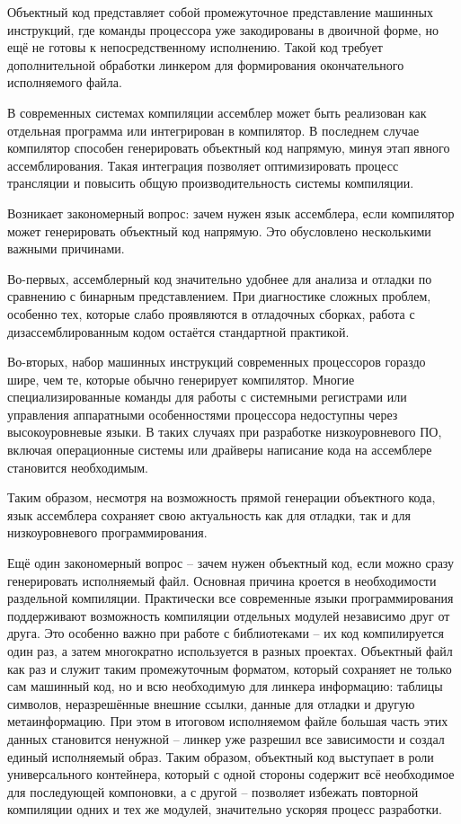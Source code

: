 Объектный код представляет собой промежуточное представление машинных инструкций, где команды процессора уже закодированы в двоичной форме, но ещё не готовы к непосредственному исполнению. Такой код требует дополнительной обработки линкером для формирования окончательного исполняемого файла.

В современных системах компиляции ассемблер может быть реализован как отдельная программа или интегрирован в компилятор. В последнем случае компилятор способен генерировать объектный код напрямую, минуя этап явного ассемблирования. Такая интеграция позволяет оптимизировать процесс трансляции и повысить общую производительность системы компиляции.

Возникает закономерный вопрос: зачем нужен язык ассемблера, если компилятор может генерировать объектный код напрямую. Это обусловлено несколькими важными причинами.

Во-первых, ассемблерный код значительно удобнее для анализа и отладки по сравнению с бинарным представлением. При диагностике сложных проблем, особенно тех, которые слабо проявляются в отладочных сборках, работа с дизассемблированным кодом остаётся стандартной практикой.

Во-вторых, набор машинных инструкций современных процессоров гораздо шире, чем те, которые обычно генерирует компилятор. Многие специализированные команды  для работы с системными регистрами или управления аппаратными особенностями процессора недоступны через высокоуровневые языки. В таких случаях при разработке низкоуровневого ПО, включая операционные системы или драйверы написание кода на ассемблере становится необходимым.

Таким образом, несмотря на возможность прямой генерации объектного кода, язык ассемблера сохраняет свою актуальность как для отладки, так и для низкоуровневого программирования.

Ещё один закономерный вопрос -- зачем нужен объектный код, если можно сразу генерировать исполняемый файл. Основная причина кроется в необходимости раздельной компиляции. Практически все современные языки программирования поддерживают возможность компиляции отдельных модулей независимо друг от друга. Это особенно важно при работе с библиотеками -- их код компилируется один раз, а затем многократно используется в разных проектах. Объектный файл как раз и служит таким промежуточным форматом, который сохраняет не только сам машинный код, но и всю необходимую для линкера информацию: таблицы символов, неразрешённые внешние ссылки, данные для отладки и другую метаинформацию. При этом в итоговом исполняемом файле большая часть этих данных становится ненужной -- линкер уже разрешил все зависимости и создал единый исполняемый образ. Таким образом, объектный код выступает в роли универсального контейнера, который с одной стороны содержит всё необходимое для последующей компоновки, а с другой -- позволяет избежать повторной компиляции одних и тех же модулей, значительно ускоряя процесс разработки.

